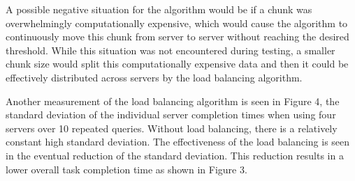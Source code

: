 \documentclass{article}
\newenvironment{Figure}
               {\par\medskip\noindent\minipage{\linewidth}}
               {\endminipage\par\medskip}
\begin{document}
\begin{multicols}{2}
A possible negative situation for the algorithm would be if a chunk was overwhelmingly computationally expensive, which would cause the algorithm to continuously move this chunk from server to server without reaching the desired threshold.  While this situation was not encountered during testing, a smaller chunk size would split this computationally expensive data and then it could be effectively distributed across servers by the load balancing algorithm. 

\begin{Figure}
  \centering
  \noindent{}
\end{Figure}


Another measurement of the load balancing algorithm is seen in Figure 4, the standard deviation of the individual server completion times when using four servers over 10 repeated queries.  Without load balancing, there is a relatively constant high standard deviation.  The effectiveness of the load balancing is seen in the eventual reduction of the standard deviation.   This reduction results in a lower overall task completion time as shown in Figure 3.   


\end{multicols}
\end{document}
